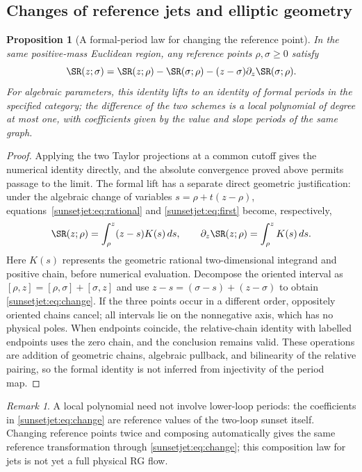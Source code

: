 \documentclass[11pt,a4paper,oneside]{article}
\theoremstyle{plain}
\newtheorem{proposition}[theorem]{Proposition}
\theoremstyle{definition}
\theoremstyle{remark}
\newtheorem{remark}[theorem]{Remark}
\numberwithin{equation}{section}
\begin{document}
\subsection{Changes of reference jets and elliptic geometry}
\begin{proposition}[A formal-period law for changing the reference point]\label{sunsetjet:prop:reference}
In the same positive-mass Euclidean region, any reference points $\rho,\sigma\geq0$ satisfy
\begin{equation}\label{sunsetjet:eq:change}
 \SR(z;\sigma)=\SR(z;\rho)-\SR(\sigma;\rho)
                -(z-\sigma)\partial_z\SR(\sigma;\rho).
\end{equation}
For algebraic parameters, this identity lifts to an identity of formal periods in the specified category;
the difference of the two schemes is a local polynomial of degree at most one, with coefficients given by the value and slope periods of the same graph.
\end{proposition}
\begin{proof}
Applying the two Taylor projections at a common cutoff gives the numerical identity directly,
and the absolute convergence proved above permits passage to the limit.
The formal lift has a separate direct geometric justification: under the algebraic change of variables
$s=\rho+t(z-\rho)$, equations~\eqref{sunsetjet:eq:rational} and \eqref{sunsetjet:eq:first} become, respectively,
\begin{equation}\label{sunsetjet:eq:weighted}
 \SR(z;\rho)=\int_\rho^z(z-s)K(s)\,ds,\qquad
 \partial_z\SR(z;\rho)=\int_\rho^zK(s)\,ds.
\end{equation}
Here $K(s)$ represents the geometric rational two-dimensional integrand and positive chain, before numerical evaluation.
Decompose the oriented interval as $[\rho,z]=[\rho,\sigma]+[\sigma,z]$
and use $z-s=(\sigma-s)+(z-\sigma)$ to obtain \eqref{sunsetjet:eq:change}.
If the three points occur in a different order, oppositely oriented chains cancel; all intervals lie on the nonnegative axis, which has no physical poles.
When endpoints coincide, the relative-chain identity with labelled endpoints uses the zero chain, and the conclusion remains valid.
These operations are addition of geometric chains, algebraic pullback, and bilinearity of the relative pairing,
so the formal identity is not inferred from injectivity of the period map.
\end{proof}

\begin{remark}
A local polynomial need not involve lower-loop periods: the coefficients in \eqref{sunsetjet:eq:change} are reference values of the two-loop sunset itself.
Changing reference points twice and composing automatically gives the same reference transformation through \eqref{sunsetjet:eq:change};
this composition law for jets is not yet a full physical RG flow.
\end{remark}
\end{document}
